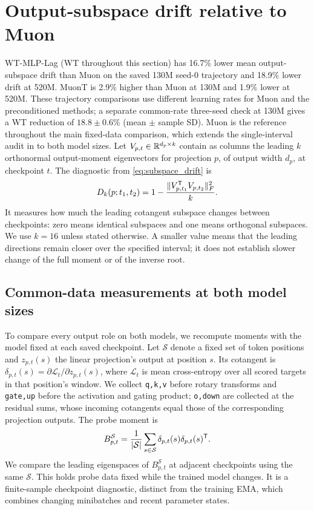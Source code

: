 \section{Output-subspace drift relative to Muon}
\label{sec:output_drift}

WT-MLP-Lag (WT throughout this section) has 16.7\% lower mean output-subspace drift than Muon on the saved 130M seed-0 trajectory and 18.9\% lower drift at 520M. MuonT is 2.9\% higher than Muon at 130M and 1.9\% lower at 520M. These trajectory comparisons use different learning rates for Muon and the preconditioned methods; a separate common-rate three-seed check at 130M gives a WT reduction of $18.8\pm0.6\%$ (mean $\pm$ sample SD). Muon is the reference throughout the main fixed-data comparison, which extends the single-interval audit in  to both model sizes. Let $V_{p,t}\in\mathbb{R}^{d_p\times k}$ contain as columns the leading $k$ orthonormal output-moment eigenvectors for projection $p$, of output width $d_p$, at checkpoint $t$. The diagnostic from \cref{eq:subspace_drift} is
\[
 D_k(p;t_1,t_2)=1-\frac{\|V_{p,t_1}^{{\mathsf{T}}}V_{p,t_2}\|_F^2}{k}.
\]
It measures how much the leading cotangent subspace changes between checkpoints: zero means identical subspaces and one means orthogonal subspaces. We use $k=16$ unless stated otherwise. A smaller value means that the leading directions remain closer over the specified interval; it does not establish slower change of the full moment or of the inverse root.

\subsection{Common-data measurements at both model sizes}

To compare every output role on both models, we recompute moments with the model fixed at each saved checkpoint. Let $\mathcal S$ denote a fixed set of token positions and $z_{p,t}(s)$ the linear projection's output at position $s$. Its cotangent is $\delta_{p,t}(s)=\partial\mathcal L_t/\partial z_{p,t}(s)$, where $\mathcal L_t$ is mean cross-entropy over all scored targets in that position's window. We collect \texttt{q,k,v} before rotary transforms and \texttt{gate,up} before the activation and gating product; \texttt{o,down} are collected at the residual sums, whose incoming cotangents equal those of the corresponding projection outputs. The probe moment is
\[
 B^{\mathcal S}_{p,t}
 =\frac{1}{|\mathcal S|}\sum_{s\in\mathcal S}
 \delta_{p,t}(s)\delta_{p,t}(s)^{{\mathsf{T}}}.
\]
We compare the leading eigenspaces of $B^{\mathcal S}_{p,t}$ at adjacent checkpoints using the same $\mathcal S$. This holds probe data fixed while the trained model changes. It is a finite-sample checkpoint diagnostic, distinct from the training EMA, which combines changing minibatches and recent parameter states.

